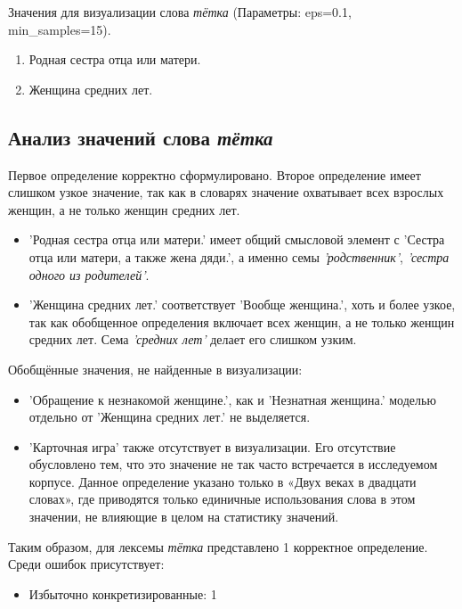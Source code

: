 Значения для визуализации слова \textit{тётка} (Параметры: eps=0.1, min\_samples=15).

\begin{enumerate}
    \item Родная сестра отца или матери.
    \item Женщина средних лет.
\end{enumerate}

\subsection*{Анализ значений слова \textit{тётка}}

Первое определение корректно сформулировано.
Второе определение имеет слишком узкое значение, так как в словарях значение охватывает всех взрослых женщин,
а не только женщин средних лет.

\begin{itemize}
    \item ’Родная сестра отца или матери.’ имеет общий смысловой элемент с
’Сестра отца или матери, а также жена дяди.’, а именно семы \textit{’родственник’}, \textit{’сестра одного из родителей’}.

    \item ’Женщина средних лет.’ соответствует ’Вообще женщина.’, хоть и более узкое,
так как обобщенное определения включает всех женщин, а не только женщин средних лет.
Сема \textit{’средних лет’} делает его слишком узким.
\end{itemize}

Обобщённые значения, не найденные в визуализации:
\begin{itemize}
    \item ’Обращение к незнакомой женщине.’, как и ’Незнатная женщина.’ моделью отдельно от
’Женщина средних лет.’ не выделяется.

    \item ’Карточная игра’ также отсутствует в визуализации.
Его отсутствие обусловлено тем, что это значение не так часто встречается в исследуемом корпусе.
Данное определение указано только в «Двух веках в двадцати словах», где приводятся только
единичные использования слова в этом значении, не влияющие в целом на статистику значений.
\end{itemize}

Таким образом, для лексемы \textit{тётка} представлено 1 корректное определение.
Среди ошибок присутствует:
\begin{itemize}
    \item Избыточно конкретизированные: 1
\end{itemize}


